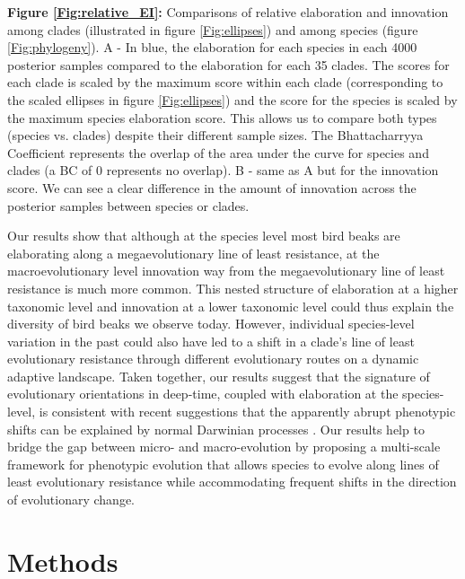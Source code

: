 \documentclass[12pt,letterpaper]{article}
\begin{document}
\bigskip

\noindent \textbf{Figure \ref{Fig:relative_EI}:} Comparisons of relative elaboration and innovation among clades (illustrated in figure  \ref{Fig:ellipses}) and among species (figure \ref{Fig:phylogeny}).
A - In blue, the elaboration for each species in each 4000 posterior samples compared to the elaboration for each 35 clades.
The scores for each clade is scaled by the maximum score within each clade (corresponding to the scaled ellipses in figure  \ref{Fig:ellipses}) and the score for the species is scaled by the maximum species elaboration score.
This allows us to compare both types (species vs. clades) despite their different sample sizes.
The Bhattacharryya Coefficient represents the overlap of the area under the curve for species and clades (a BC of 0 represents no overlap).
B - same as A but for the innovation score.
We can see a clear difference in the amount of innovation across the posterior samples between species or clades.


Our results show that although at the species level most bird beaks are elaborating along a megaevolutionary line of least resistance, at the macroevolutionary level innovation way from the megaevolutionary line of least resistance is much more common.
This nested structure of elaboration at a higher taxonomic level and innovation at a lower taxonomic level could thus explain the diversity of bird beaks we observe today.
However, individual species-level variation in the past could also have led to a shift in a clade's line of least evolutionary resistance through different evolutionary routes on a dynamic adaptive landscape. Taken together, our results suggest that the signature of evolutionary orientations in deep-time, coupled with elaboration at the species-level, is consistent with recent suggestions that the apparently abrupt phenotypic shifts can be explained by normal Darwinian processes \cite{pagel2022general}.
Our results help to bridge the gap between micro- and macro-evolution by proposing a multi-scale framework for  phenotypic evolution that allows species to evolve along lines of least evolutionary resistance while accommodating frequent shifts in the direction of evolutionary change.



\section{Methods}
\end{document}
